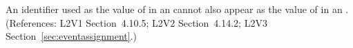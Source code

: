 An identifier used as the value of  in an \EventAssignment
cannot also appear as the value of  in an \AssignmentRule.
(References: L2V1 Section~4.10.5; L2V2 Section~4.14.2;
L2V3 Section~\ref{sec:eventassignment}.)
